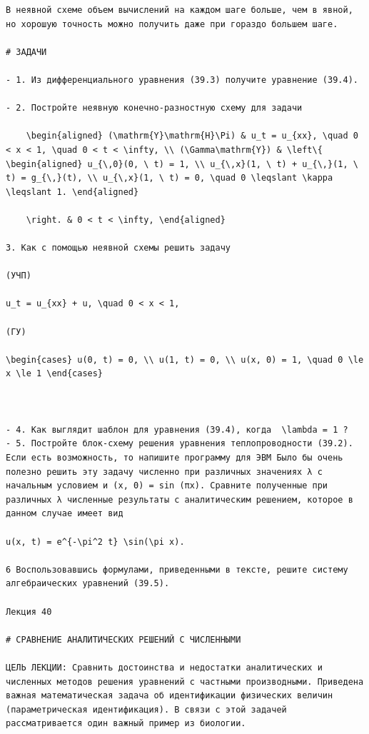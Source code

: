\documentclass[
  ukrainian,
]{article}
\begin{document}
\begin{verbatim}
В неявной схеме объем вычислений на каждом шаге больше, чем в явной, но хорошую точность можно получить даже при гораздо большем шаге.

# ЗАДАЧИ

- 1. Из дифференциального уравнения (39.3) получите уравнение (39.4).

- 2. Постройте неявную конечно-разностную схему для задачи

    \begin{aligned} (\mathrm{Y}\mathrm{H}\Pi) & u_t = u_{xx}, \quad 0 < x < 1, \quad 0 < t < \infty, \\ (\Gamma\mathrm{Y}) & \left\{ \begin{aligned} u_{\,0}(0, \ t) = 1, \\ u_{\,x}(1, \ t) + u_{\,}(1, \ t) = g_{\,}(t), \\ u_{\,x}(1, \ t) = 0, \quad 0 \leqslant \kappa \leqslant 1. \end{aligned}

    \right. & 0 < t < \infty, \end{aligned}

3. Как с помощью неявной схемы решить задачу

(УЧП) 

u_t = u_{xx} + u, \quad 0 < x < 1,

(ГУ)  

\begin{cases} u(0, t) = 0, \\ u(1, t) = 0, \\ u(x, 0) = 1, \quad 0 \le x \le 1 \end{cases}

  

- 4. Как выглядит шаблон для уравнения (39.4), когда  \lambda = 1 ?
- 5. Постройте блок-схему решения уравнения теплопроводности (39.2). Если есть возможность, то напишите программу для ЭВМ Было бы очень полезно решить эту задачу численно при различных значениях λ с начальным условием и (x, 0) = sin (πx). Сравните полученные при различных λ численные результаты с аналитическим решением, которое в данном случае имеет вид

u(x, t) = e^{-\pi^2 t} \sin(\pi x).

6 Воспользовавшись формулами, приведенными в тексте, решите систему алгебраических уравнений (39.5).

Лекция 40

# СРАВНЕНИЕ АНАЛИТИЧЕСКИХ РЕШЕНИЙ С ЧИСЛЕННЫМИ

ЦЕЛЬ ЛЕКЦИИ: Сравнить достоинства и недостатки аналитических и численных методов решения уравнений с частными производными. Приведена важная математическая задача об идентификации физических величин (параметрическая идентификация). В связи с этой задачей рассматривается один важный пример из биологии.


\end{verbatim}
\end{document}

